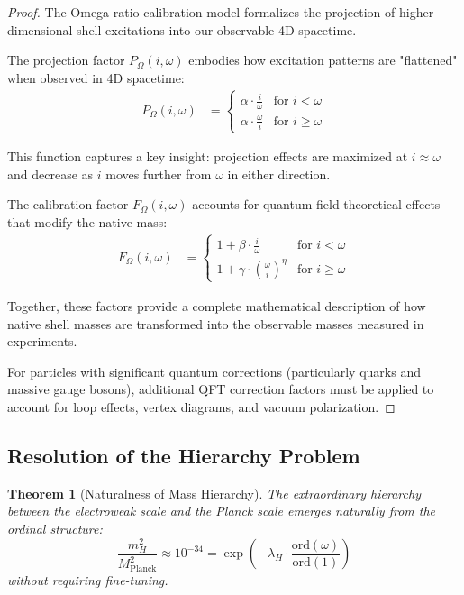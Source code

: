 \documentclass[12pt,a4paper]{article}
\newtheorem{theorem}{Theorem}[section]
\newcommand{\ord}{\text{ord}}
\begin{document}
\begin{proof}
The Omega-ratio calibration model formalizes the projection of higher-dimensional shell excitations into our observable 4D spacetime.

The projection factor $P_{\Omega}(i, \omega)$ embodies how excitation patterns are "flattened" when observed in 4D spacetime:
\begin{align}
P_{\Omega}(i, \omega) &= 
\begin{cases}
\alpha \cdot \frac{i}{\omega} & \text{for } i < \omega \\
\alpha \cdot \frac{\omega}{i} & \text{for } i \geq \omega
\end{cases}
\end{align}

This function captures a key insight: projection effects are maximized at $i \approx \omega$ and decrease as $i$ moves further from $\omega$ in either direction.

The calibration factor $F_{\Omega}(i, \omega)$ accounts for quantum field theoretical effects that modify the native mass:
\begin{align}
F_{\Omega}(i, \omega) &= 
\begin{cases}
1 + \beta \cdot \frac{i}{\omega} & \text{for } i < \omega \\
1 + \gamma \cdot \left(\frac{\omega}{i}\right)^{\eta} & \text{for } i \geq \omega
\end{cases}
\end{align}

Together, these factors provide a complete mathematical description of how native shell masses are transformed into the observable masses measured in experiments.

For particles with significant quantum corrections (particularly quarks and massive gauge bosons), additional QFT correction factors must be applied to account for loop effects, vertex diagrams, and vacuum polarization.
\end{proof}

\subsection{Resolution of the Hierarchy Problem}
\label{subsec:hierarchy-problem}

\begin{theorem}[Naturalness of Mass Hierarchy]
\label{thm:naturalness}
The extraordinary hierarchy between the electroweak scale and the Planck scale emerges naturally from the ordinal structure:
\begin{equation}
\frac{m_H^2}{M_{\text{Planck}}^2} \approx 10^{-34} = \exp\left(-\lambda_H \cdot \frac{\ord(\omega)}{\ord(1)}\right)
\end{equation}
without requiring fine-tuning.
\end{theorem}
\end{document}
